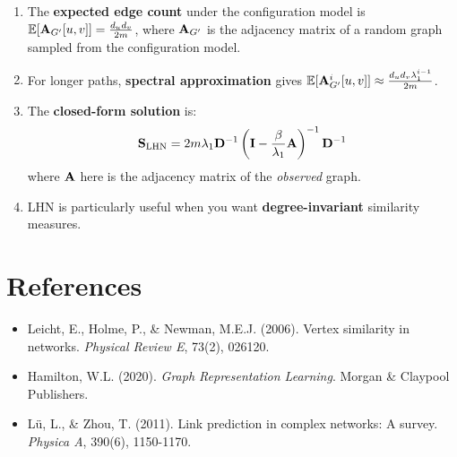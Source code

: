\begin{notechapter}
\begin{tcolorbox}[colback=gray!10, colframe=gray!50!black, title=\textbf{Key Takeaways}]
\begin{enumerate}
    \item The \textbf{expected edge count} under the configuration model is $\mathbb{E}[\mathbf{A}_{G'}[u,v]] = \frac{d_u d_v}{2m}$, where $\mathbf{A}_{G'}$ is the adjacency matrix of a random graph sampled from the configuration model.
    
    \item For longer paths, \textbf{spectral approximation} gives $\mathbb{E}[\mathbf{A}_{G'}^i[u,v]] \approx \frac{d_u d_v \lambda_1^{i-1}}{2m}$.
    
    \item The \textbf{closed-form solution} is:
    \[
    \mathbf{S}_{\text{LHN}} = 2 m \lambda_1 \mathbf{D}^{-1} \left(\mathbf{I} - \frac{\beta}{\lambda_1}\mathbf{A}\right)^{-1} \mathbf{D}^{-1}
    \]
    where $\mathbf{A}$ here is the adjacency matrix of the \emph{observed} graph.
    
    \item LHN is particularly useful when you want \textbf{degree-invariant} similarity measures.
\end{enumerate}
\end{tcolorbox}

\section*{References}

\begin{itemize}
    \item Leicht, E., Holme, P., \& Newman, M.E.J. (2006). Vertex similarity in networks. \textit{Physical Review E}, 73(2), 026120.
    
    \item Hamilton, W.L. (2020). \textit{Graph Representation Learning}. Morgan \& Claypool Publishers.
    
    \item Lü, L., \& Zhou, T. (2011). Link prediction in complex networks: A survey. \textit{Physica A}, 390(6), 1150-1170.
\end{itemize}
\end{notechapter}
